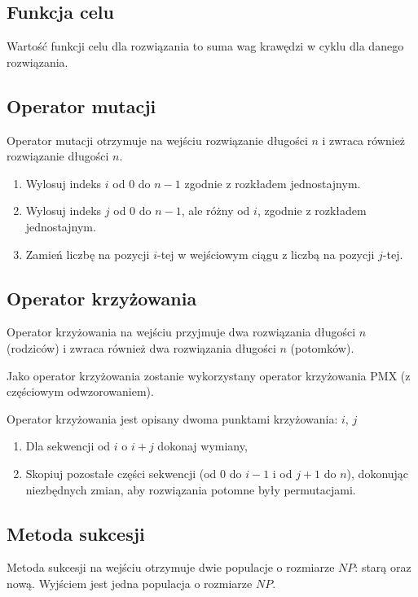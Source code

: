 \documentclass[12pt, a4paper]{article}
\begin{document}
\subsection{Funkcja celu}

Wartość funkcji celu dla rozwiązania to suma wag krawędzi w cyklu dla danego rozwiązania.

\subsection{Operator mutacji}

Operator mutacji otrzymuje na wejściu rozwiązanie długości $n$ i zwraca również rozwiązanie długości $n$.

\begin{enumerate}
 \item Wylosuj indeks $i$ od 0 do $n-1$ zgodnie z rozkładem jednostajnym.
 \item Wylosuj indeks $j$ od 0 do $n-1$, ale różny od $i$, zgodnie z rozkładem jednostajnym.
 \item Zamień liczbę na pozycji $i$-tej w wejściowym ciągu z liczbą na pozycji $j$-tej.
\end{enumerate}

\subsection{Operator krzyżowania}

Operator krzyżowania na wejściu przyjmuje dwa rozwiązania długości $n$ (rodziców) i zwraca również dwa rozwiązania długości $n$ (potomków). 

Jako operator krzyżowania zostanie wykorzystany operator krzyżowania {PMX} (z częściowym odwzorowaniem).

Operator krzyżowania jest opisany dwoma punktami krzyżowania: $i$, $j$
\begin{enumerate}
	\item Dla sekwencji od $i$ o $i+j$ dokonaj wymiany,
	\item Skopiuj pozostałe części sekwencji (od $0$ do $i-1$ i od $j+1$ do $n$), dokonując niezbędnych zmian, aby rozwiązania potomne były permutacjami.
\end{enumerate}

\subsection{Metoda sukcesji}

Metoda sukcesji na wejściu otrzymuje dwie populacje o rozmiarze $NP$: starą oraz nową. Wyjściem jest jedna populacja o rozmiarze $NP$.
\end{document}
